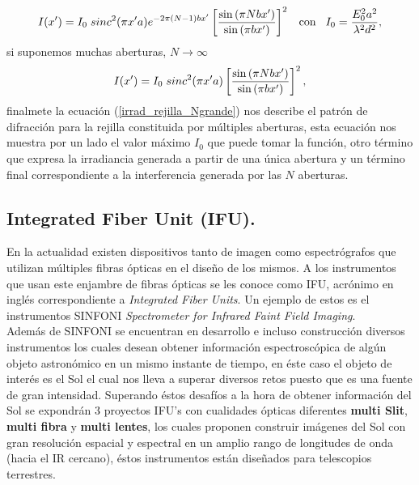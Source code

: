 \begin{equation}\label{irrad_rejilla}
    I(x')=I_0\hspace{1mm}{sinc}^2(\pi x' a) e^{-2\pi (N-1) bx'}\left[ \frac{\sin{(\pi N bx')}}{\sin{(\pi  bx')}} \right]^2 \hspace{3mm}\text{con}\hspace{3mm}I_0=\frac{E_{0}^{2} a^2}{\lambda^2 d^2},
\end{equation}
si suponemos muchas aberturas, $N\rightarrow\infty$
\begin{equation}\label{irrad_rejilla_Ngrande}
    I(x')=I_0\hspace{1mm}{sinc}^2(\pi x' a) \left[ \frac{\sin{(\pi N bx')}}{\sin{(\pi  bx')}} \right]^2,
\end{equation}
finalmete la ecuación (\ref{irrad_rejilla_Ngrande}) nos describe el patrón de difracción para la rejilla constituida por múltiples aberturas, esta ecuación nos muestra por un lado el valor máximo $I_0$ que puede tomar la función, otro término que expresa la irradiancia generada a partir de una única abertura y un término final correspondiente a la interferencia generada por las $N$ aberturas.

\subsection{Integrated Fiber Unit (IFU).}

En la actualidad existen dispositivos tanto de imagen como espectrógrafos que utilizan múltiples fibras ópticas en el diseño de los mismos. A los instrumentos que usan este enjambre de fibras ópticas se les conoce como IFU, acrónimo en inglés correspondiente a \textit{Integrated Fiber Units}. Un ejemplo de estos es el instrumentos SINFONI \textit{Spectrometer for Infrared Faint Field Imaging}.\\
Además de SINFONI se encuentran en desarrollo e incluso construcción diversos instrumentos los cuales desean obtener información espectroscópica de algún objeto astronómico en un mismo instante de tiempo, en éste caso el objeto de interés es el Sol el cual nos lleva a superar diversos retos puesto que es una fuente de gran intensidad. Superando éstos desafíos a la hora de obtener información del Sol se expondrán 3 proyectos IFU's con cualidades ópticas diferentes \textbf{multi Slit}, \textbf{multi fibra} y \textbf{multi lentes}, los cuales proponen construir imágenes del Sol con gran resolución espacial y espectral en un amplio rango de longitudes de onda (hacia el IR cercano), éstos instrumentos están diseñados para telescopios terrestres.\\

